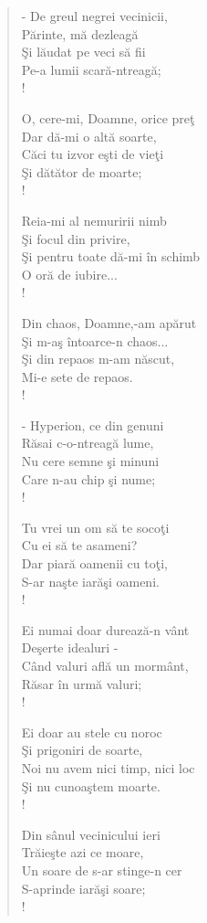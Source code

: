 \documentclass{article}
\begin{document}
\begin{small}
\begin{multicols}{3}
\begin{verse}
- De greul negrei vecinicii, \\
Părinte, mă dezleagă \\
Şi lăudat pe veci să fii \\
Pe-a lumii scară-ntreagă; \\!

O, cere-mi, Doamne, orice preţ \\
Dar dă-mi o altă soarte, \\
Căci tu izvor eşti de vieţi \\
Şi dătător de moarte; \\!

Reia-mi al nemuririi nimb \\
Şi focul din privire, \\
Şi pentru toate dă-mi în schimb \\
O oră de iubire... \\!

Din chaos, Doamne,-am apărut \\
Şi m-aş întoarce-n chaos... \\
Şi din repaos m-am născut, \\
Mi-e sete de repaos. \\!

- Hyperion, ce din genuni \\
Răsai c-o-ntreagă lume, \\
Nu cere semne şi minuni \\
Care n-au chip şi nume; \\!

Tu vrei un om să te socoţi \\
Cu ei să te asameni? \\
Dar piară oamenii cu toţi, \\
S-ar naşte iarăşi oameni. \\!

Ei numai doar durează-n vânt \\
Deşerte idealuri - \\
Când valuri află un mormânt, \\
Răsar în urmă valuri; \\!

Ei doar au stele cu noroc \\
Şi prigoniri de soarte, \\
Noi nu avem nici timp, nici loc \\
Şi nu cunoaştem moarte. \\!

Din sânul vecinicului ieri \\
Trăieşte azi ce moare, \\
Un soare de s-ar stinge-n cer \\
S-aprinde iarăşi soare; \\!


\end{verse}
\end{multicols}
\end{small}
\end{document}
